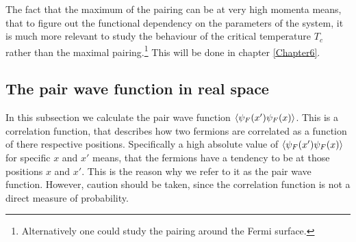The fact that the maximum of the pairing can be at very high momenta means, that to figure out the functional dependency on the parameters of the system, it is much more relevant to study the behaviour of the critical temperature $T_c$ rather than the maximal pairing.\footnote{Alternatively one could study the pairing around the Fermi surface.} This will be done in chapter \ref{Chapter6}.

\subsection{The pair wave function in real space}
In this subsection we calculate the pair wave function $\braket{\psi_F(x')\psi_F(x)}$. This is a correlation function, that describes how two fermions are correlated as a function of there respective positions. Specifically a high absolute value of $\braket{\psi_F(x')\psi_F(x)}$ for specific $x$ and $x'$ means, that the fermions have a tendency to be at those positions $x$ and $x'$. This is the reason why we refer to it as the pair wave function. However, caution should be taken, since the correlation function is not a direct measure of probability. 

